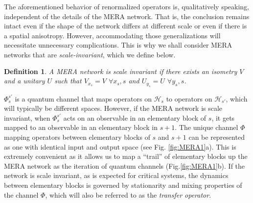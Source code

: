 \documentclass[a4paper,11pt]{article}
\newcommand{\1}{\mathbbm{1}}
\newcommand{\cH}{\mathcal{H}}
\newcommand{\mjk}[1]{{\color{green} #1}}
\newtheorem{defi}{Definition}
\begin{document}

The aforementioned behavior of renormalized operators is, qualitatively speaking, independent of the details of the MERA network. That is, the conclusion remains intact even if the shape of the
network differs at different scale or even if there is a spatial anisotropy. However, accommodating those generalizations will necessitate unnecessary complications. This is why we shall consider
MERA networks that are  \emph{scale-invariant}, which we define below.

\begin{defi}
	A MERA network is scale invariant if there exists an isometry $V$ and a unitary $U$ such that $V_{x_s} = V$ $\forall x_s,s$ and $U_{y_s}=U$ $\forall y_s, s$.
\end{defi}

$\Phi_{s}^{s'}$ is a quantum channel that maps operators on $\cH_s$ to operators on $\cH_{s'}$, which will typically be different spaces. However, if the MERA network is scale invariant, when $\Phi_s^{s'}$ acts on an observable in an elementary block of $s$, it gets mapped to an observable in an elementary block in $s+1$. The unique channel $\Phi$ mapping operators between elementary blocks of $s$ and $s+1$ can be represented as one with identical input and output space (see Fig. \ref{fig:MERA1}a). This is extremely convenient as it allows us to map a ``trail'' of elementary blocks up the MERA network as the iteration of quantum channels (Fig.\ref{fig:MERA1}b). If the network is scale invariant, as is expected for critical systems, the dynamics between elementary blocks is governed by stationarity and mixing properties of the channel $\Phi$, which will also be referred to as the \textit{transfer operator}.
\end{document}
